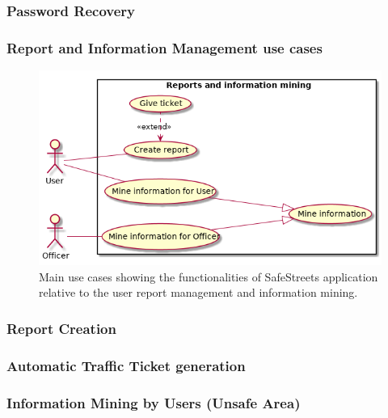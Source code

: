 \subsubsection{Password Recovery}


\subsubsection{Report and Information Management use cases}
\begin{figure}[htp]
	\centering
	\includegraphics[width=\textwidth]{images/useCases/uc_report_and_information_mining.png}
	\caption{Main use cases showing the functionalities of SafeStreets application relative to the user report management and information mining.} 
	\label{fig:reportmanagement} 
\end{figure}

\newpage
\subsubsection{Report Creation}

\newpage
{}
\subsubsection{Automatic Traffic Ticket generation}

\newpage
\subsubsection{Information Mining by Users (Unsafe Area)}

\newpage
{}
